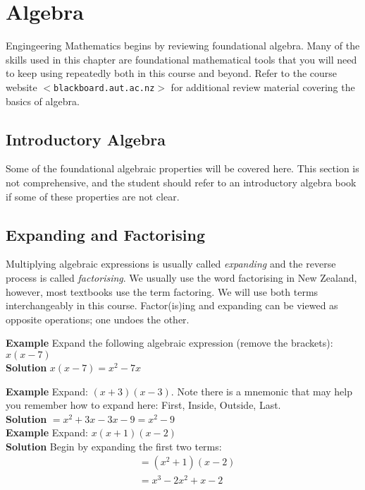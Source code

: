 
\chapter{Algebra}
Engingeering Mathematics begins by reviewing foundational algebra. Many of the skills used in this chapter are foundational mathematical tools that you will need to keep using repeatedly both in this course and beyond. Refer to the course website $<$\texttt{blackboard.aut.ac.nz}$>$ for additional review material covering the basics of algebra.

\section{Introductory Algebra}
Some of the foundational algebraic properties will be covered here. This section is not comprehensive, and the student should refer to an introductory algebra book if some of these properties are not clear.
\section*{Expanding and Factorising}
Multiplying algebraic expressions is usually called \emph{expanding}
and the reverse process is called \emph{factorising}. We usually use the word factorising in New Zealand, however, most textbooks use the term factoring. We will use both terms interchangeably in this course. Factor(is)ing and expanding can be viewed as opposite operations; one undoes the other.  

\textbf{Example} Expand the following algebraic expression (remove the brackets): $x(x-7)$\\
\textbf{Solution} $x(x-7)=x^2-7x$

\textbf{Example} Expand: $(x+3)(x-3)$. Note there is a mnemonic \textbf{} that may help you remember how to expand here: First, Inside, Outside, Last.\\
\textbf{Solution} $=x^2+3x-3x-9=x^2-9$\\

\textbf{Example} Expand: $x(x+1)(x-2)$\\
\textbf{Solution} Begin by expanding the first two terms:
\begin{align*} &=(x^2+1)(x-2)\\
&=x^3-2x^2+x-2
\end{align*}

